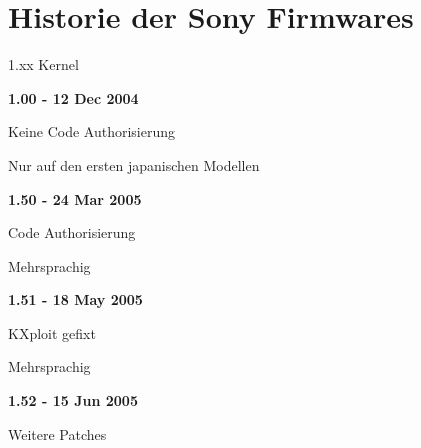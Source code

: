 \documentclass[mode=print,paper=screen,style=jefka]{powerdot}
\begin{document}
\section{Historie der Sony Firmwares}
\begin{slide}{1.xx Kernel}
	\begin{large}\textbf{1.00 - 12 Dec 2004}\end{large}
	\begin{list}{-}{}
		\item{Keine Code Authorisierung}
		\item{Nur auf den ersten japanischen Modellen}
	\end{list}
	\begin{large}\textbf{1.50 - 24 Mar 2005}\end{large}
	\begin{list}{-}{}
		\item{Code Authorisierung}
		\item{Mehrsprachig}
	\end{list}
	\begin{large}\textbf{1.51 - 18 May 2005}\end{large}
	\begin{list}{-}{}
		\item{KXploit gefixt}
		\item{Mehrsprachig}
	\end{list}
	\begin{large}\textbf{1.52 - 15 Jun 2005}\end{large}
	\begin{list}{-}{}
		\item{Weitere Patches}
	\end{list}
\end{slide}
\end{document}
